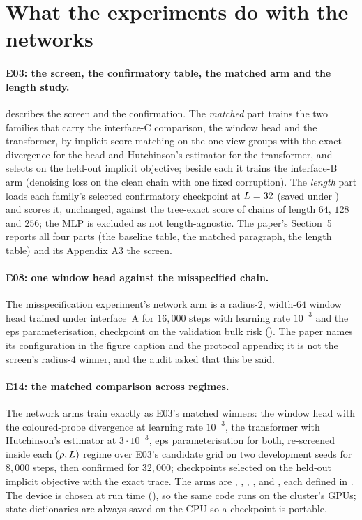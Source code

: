 \section{What the experiments do with the networks}
\label{sec:net-experiments}

\paragraph{E03: the screen, the confirmatory table, the matched arm and the length study.}
 describes the screen and the confirmation. The
\emph{matched} part trains the two families that carry the interface-C comparison, the
window head and the transformer, by implicit score matching on the one-view groups with
the exact divergence for the head and Hutchinson's estimator for the transformer, and
selects on the held-out implicit objective; beside each it trains the interface-B arm
(denoising loss on the clean chain with one fixed corruption). The \emph{length} part
loads each family's selected confirmatory checkpoint at $L=32$ (saved under
) and scores it, unchanged, against the tree-exact score of chains
of length $64$, $128$ and $256$; the MLP is excluded as not length-agnostic. The paper's
Section~5 reports all four parts (the baseline table, the matched paragraph, the length
table) and its Appendix A3 the screen.

\paragraph{E08: one window head against the misspecified chain.}
The misspecification experiment's network arm is a radius-$2$, width-$64$ window head
trained under interface~A for $16{,}000$ steps with learning rate $10^{-3}$ and the eps
parameterisation, checkpoint on the validation bulk risk ().
The paper names its configuration in the figure caption and the protocol appendix; it is
not the screen's radius-$4$ winner, and the audit asked that this be said.

\paragraph{E14: the matched comparison across regimes.}
The network arms train exactly as E03's matched winners: the window head with the
coloured-probe divergence at learning rate $10^{-3}$, the transformer with Hutchinson's
estimator at $3\cdot10^{-3}$, eps parameterisation for both, re-screened inside each
$(\rho,L)$ regime over E03's candidate grid on two development seeds for $8{,}000$
steps, then confirmed for $32{,}000$; checkpoints selected on the held-out implicit
objective with the exact trace. The arms are , ,
, ,  and
, each defined in . The device is chosen at run
time (), so the same code runs on the cluster's GPUs; state dictionaries
are always saved on the CPU so a checkpoint is portable.

